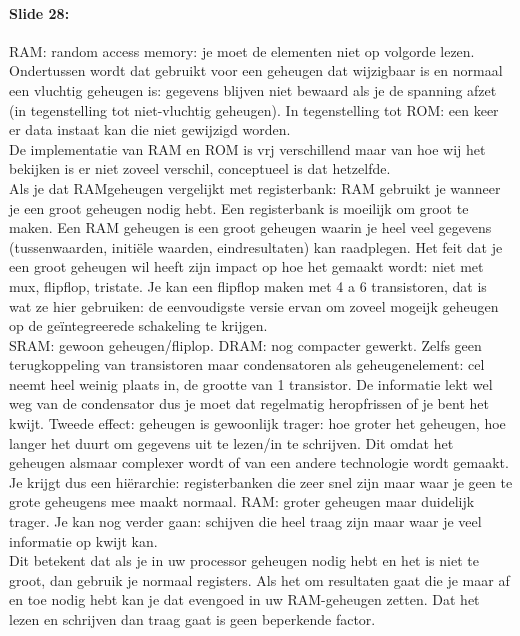 \documentclass[10pt,a4paper]{book}
\begin{document}
\paragraph{Slide 28:} RAM: random access memory: je moet de elementen niet op volgorde lezen. Ondertussen wordt dat gebruikt voor een geheugen dat wijzigbaar is en normaal een vluchtig geheugen is: gegevens blijven niet bewaard als je de spanning afzet (in tegenstelling tot niet-vluchtig geheugen). In tegenstelling tot ROM: een keer er data instaat kan die niet gewijzigd worden.\\
De implementatie van RAM en ROM is vrj verschillend maar van hoe wij het bekijken is er niet zoveel verschil, conceptueel is dat hetzelfde.\\
Als je dat RAMgeheugen vergelijkt met registerbank: RAM gebruikt je wanneer je een groot geheugen nodig hebt. Een registerbank is moeilijk om groot te maken. Een RAM geheugen is een groot geheugen waarin je heel veel gegevens (tussenwaarden, initi\"ele waarden, eindresultaten) kan raadplegen. Het feit dat je een groot geheugen wil heeft zijn impact op hoe het gemaakt wordt: niet met mux, flipflop, tristate. Je kan een flipflop maken met 4 a 6 transistoren, dat is wat ze hier gebruiken: de eenvoudigste versie ervan om zoveel mogeijk geheugen op de ge\"integreerede schakeling te krijgen.\\
SRAM: gewoon geheugen/fliplop. DRAM: nog compacter gewerkt. Zelfs geen terugkoppeling van transistoren maar condensatoren als geheugenelement: cel neemt heel weinig plaats in, de grootte van 1 transistor. De informatie lekt wel weg van de condensator dus je moet dat regelmatig heropfrissen of je bent het kwijt. Tweede effect: geheugen is gewoonlijk trager: hoe groter het geheugen, hoe langer het duurt om gegevens uit te lezen/in te schrijven. Dit omdat het geheugen alsmaar complexer wordt of van een andere technologie wordt gemaakt.\\
Je krijgt dus een hi\"erarchie: registerbanken die zeer snel zijn maar waar je geen te grote geheugens mee maakt normaal. RAM: groter geheugen maar duidelijk trager. Je kan nog verder gaan: schijven die heel traag zijn maar waar je veel informatie op kwijt kan.\\
Dit betekent dat als je in uw processor geheugen nodig hebt en het is niet te groot, dan gebruik je normaal registers. Als het om resultaten gaat die je maar af en toe nodig hebt kan je dat evengoed in uw RAM-geheugen zetten. Dat het lezen en schrijven dan traag gaat is geen beperkende factor.\\
\end{document}
